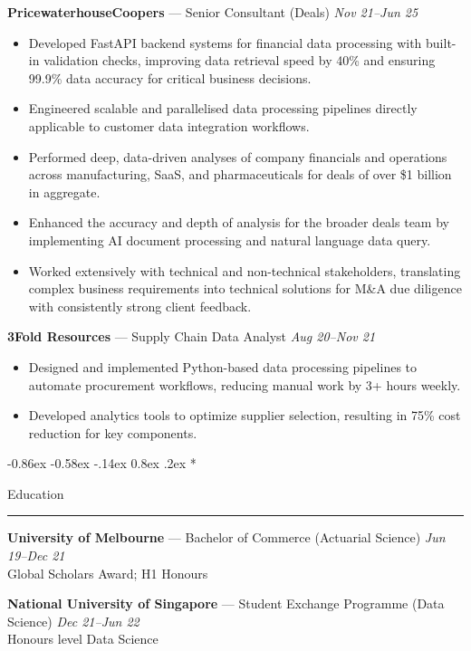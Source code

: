 \documentclass[10pt,letterpaper]{article}
\makeatletter
\renewcommand{\section}{\@startsection{section}{1}{\z@}%
  {-0.86ex \@plus -0.58ex \@minus -.14ex}%
  {0.8ex \@plus.2ex}%
  {\normalfont\large\bfseries}}
\makeatother
\begin{document}
{\bfseries PricewaterhouseCoopers} — Senior Consultant (Deals) \hfill \textit{Nov 21--Jun 25}\vspace{-0.2em}
\begin{itemize}
  \item Developed FastAPI backend systems for financial data processing with built-in validation checks, improving data retrieval speed by 40\% and ensuring 99.9\% data accuracy for critical business decisions.
  \item Engineered scalable and parallelised data processing pipelines directly applicable to customer data integration workflows.
  \item Performed deep, data-driven analyses of company financials and operations across manufacturing, SaaS, and pharmaceuticals for deals of over \$1 billion in aggregate.
  \item Enhanced the accuracy and depth of analysis for the broader deals team by implementing AI document processing and natural language data query.
  \item Worked extensively with technical and non-technical stakeholders, translating complex business requirements into technical solutions for M\&A due diligence with consistently strong client feedback.
\end{itemize}

{\bfseries 3Fold Resources} — Supply Chain Data Analyst \hfill \textit{Aug 20--Nov 21}\vspace{-0.2em}
\begin{itemize}
  \item Designed and implemented Python-based data processing pipelines to automate procurement workflows, reducing manual work by 3+ hours weekly.
  \item Developed analytics tools to optimize supplier selection, resulting in 75\% cost reduction for key components.
\end{itemize}

\section*{Education\strut}
\hrule\vspace{0.2em}

{\bfseries University of Melbourne} — Bachelor of Commerce (Actuarial Science) \hfill \textit{Jun 19--Dec 21}\\
Global Scholars Award; H1 Honours

{\bfseries National University of Singapore} — Student Exchange Programme (Data Science) \hfill \textit{Dec 21--Jun 22}\\
Honours level Data Science
\end{document}
